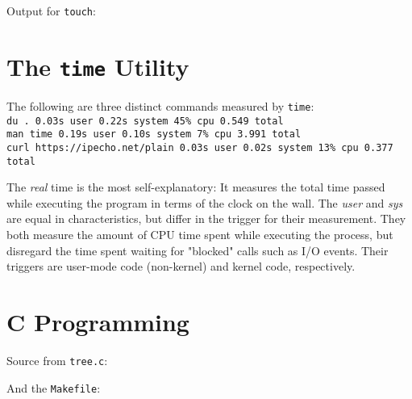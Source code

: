 \documentclass[a4paper, 12pt, titlepage]{article}
\begin{document}
  

  Output for \texttt{touch}:
  
  

  \section{The \texttt{time} Utility}

  The following are three distinct commands measured by \texttt{time}:\\
  \verb+du . 0.03s user 0.22s system 45% cpu 0.549 total+\\
  \verb+man time 0.19s user 0.10s system 7% cpu 3.991 total+\\
  \verb+curl https://ipecho.net/plain 0.03s user 0.02s system 13% cpu 0.377 total+

  The \textit{real} time is the most self-explanatory: It measures the total time passed
  while executing the program in terms of the clock on the wall.
  The \textit{user} and \textit{sys} are equal in characteristics, but differ in
  the trigger for their measurement.
  They both measure the amount of CPU time spent while executing the process,
  but disregard the time spent waiting for "blocked" calls such as I/O events.
  Their triggers are user-mode code (non-kernel) and kernel code, respectively.

  \section{C Programming}

  Source from \texttt{tree.c}:

  

  And the \texttt{Makefile}:

  
  
\end{document}
